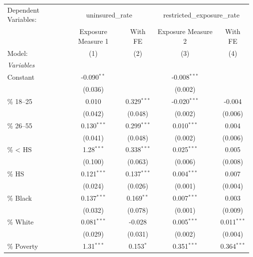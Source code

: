 
\begingroup
\centering
\begin{tabular}{lcccc}
   \tabularnewline \midrule \midrule
   Dependent Variables: & \multicolumn{2}{c}{uninsured\_rate} & \multicolumn{2}{c}{restricted\_exposure\_rate}\\
                           & Exposure Measure 1 & With FE       & Exposure Measure 2 & With FE \\   
   Model:                  & (1)                & (2)           & (3)                & (4)\\  
   \midrule
   \emph{Variables}\\
   Constant                & -0.090$^{**}$      &               & -0.008$^{***}$     &   \\   
                           & (0.036)            &               & (0.002)            &   \\   
   \% 18--25               & 0.010              & 0.329$^{***}$ & -0.020$^{***}$     & -0.004\\   
                           & (0.042)            & (0.048)       & (0.002)            & (0.006)\\   
   \% 26--55               & 0.130$^{***}$      & 0.299$^{***}$ & 0.010$^{***}$      & 0.004\\   
                           & (0.041)            & (0.048)       & (0.002)            & (0.006)\\   
   \% < HS                 & 1.28$^{***}$       & 0.338$^{***}$ & 0.025$^{***}$      & 0.005\\   
                           & (0.100)            & (0.063)       & (0.006)            & (0.008)\\   
   \% HS                   & 0.121$^{***}$      & 0.137$^{***}$ & 0.004$^{***}$      & 0.007\\   
                           & (0.024)            & (0.026)       & (0.001)            & (0.004)\\   
   \% Black                & 0.137$^{***}$      & 0.169$^{**}$  & 0.007$^{***}$      & 0.003\\   
                           & (0.032)            & (0.078)       & (0.001)            & (0.009)\\   
   \% White                & 0.081$^{***}$      & -0.028        & 0.005$^{***}$      & 0.011$^{***}$\\   
                           & (0.029)            & (0.031)       & (0.002)            & (0.004)\\   
   \% Poverty              & 1.31$^{***}$       & 0.153$^{*}$   & 0.351$^{***}$      & 0.364$^{***}$\\   

\end{tabular}
